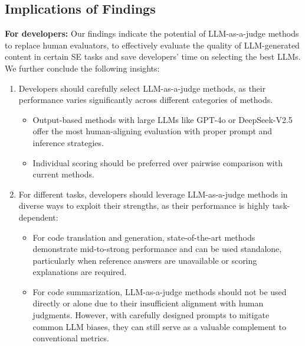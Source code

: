 \subsection{Implications of Findings}

\textbf{For developers:} Our findings indicate the potential of LLM-as-a-judge methods to replace human evaluators, to effectively evaluate the quality of LLM-generated content in certain SE tasks and save developers' time on selecting the best LLMs. We further conclude the following insights:

\begin{enumerate}

    \item Developers should carefully select LLM-as-a-judge methods, as their performance varies significantly across different categories of methods.

    \begin{itemize}
    
        \item Output-based methods with large LLMs like GPT-4o or DeepSeek-V2.5 offer the most human-aligning evaluation with proper prompt and inference strategies. 
        
        \item Individual scoring should be preferred over pairwise comparison with current methods.

    \end{itemize}
    
    \item For different tasks, developers should leverage LLM-as-a-judge methods in diverse ways to exploit their strengths, as their performance is highly task-dependent:
    
    \begin{itemize}
    
        \item For code translation and generation, state-of-the-art methods demonstrate mid-to-strong performance and can be used standalone, particularly when reference answers are unavailable or scoring explanations are required.

        \item For code summarization, LLM-as-a-judge methods should not be used directly or alone due to their insufficient alignment with human judgments. However, with carefully designed prompts to mitigate common LLM biases, they can still serve as a valuable complement to conventional metrics.
        
    \end{itemize}
    
\end{enumerate}

